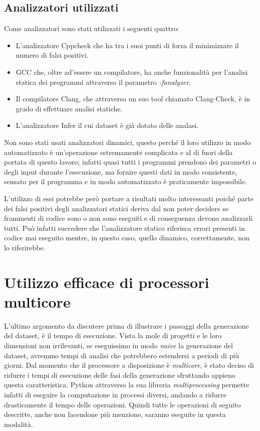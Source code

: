 \subsection{Analizzatori utilizzati}
Come analizzatori sono stati utilizzati i seguenti quattro:
    \begin{itemize}
        \item L'analizzatore Cppcheck che ha tra i suoi punti di forza il minimizzare il numero di falsi positivi.
        \item GCC che, oltre ad'essere un compilatore, ha anche funzionalità per l'analisi statica dei programmi attraverso il parametro \textit{-fanalyzer}.
        \item Il compilatore Clang, che attraverso un suo tool chiamato Clang-Check, è in grado di effettuare analisi statiche.
        \item L'analizzatore Infer il cui dataset è già dotato delle analasi.
    \end{itemize}
Non sono stati usati analizzatori dinamici, questo perché il loro utilizzo in modo automatizzato è un'operazione estremamente complicata e al di fuori della portata di questo lavoro;
infatti quasi tutti i programmi prendono dei parametri o degli input durante l'esecuzione, ma fornire questi dati in modo consistente, sensato per il programma e in modo automatizzato è praticamente impossibile.

L'utilizzo di essi potrebbe però portare a risultati molto interessanti poiché parte dei falsi positivi degli analizzatori statici deriva dal non poter decidere se frammenti di codice sono o non sono eseguiti e di conseguenza devono analizzarli tutti.
Può infatti succedere che l'analizzatore statico riferisca errori presenti in codice mai eseguito mentre, in questo caso, quello dinamico, correttamente, non lo riferirebbe.

\section{Utilizzo efficace di processori multicore}
L'ultimo argomento da discutere prima di illustrare i passaggi della generazione del dataset, è il tempo di esecuzione. 
Vista la mole di progetti e le loro dimensioni non irrilevanti, se eseguissimo in modo \textit{naive} la generazione del dataset, avremmo tempi di analisi che potrebbero estendersi a periodi di più giorni.
Dal momento che il processore a disposizione è \textit{multicore}, è stato deciso di ridurre i tempi di esecuzione delle fasi della generazione sfruttando appieno questa caratteristica.
Python attraverso la sua libreria \textit{multiprocessing} permette infatti di eseguire la computazione in processi diversi, andando a ridurre drasticamente il tempo delle operazioni.
Quindi tutte le operazioni di seguito descritte, anche non facendone più menzione, saranno eseguite in questa modalità.

